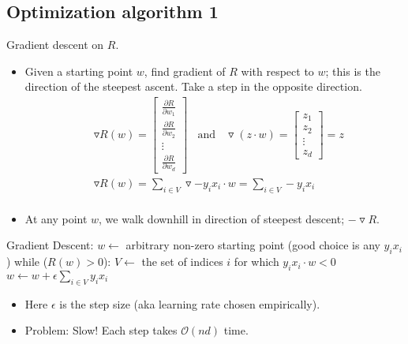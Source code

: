 \documentclass[10pt]{article}
\begin{document}
	\subsection*{Optimization algorithm 1} Gradient descent on $R$.
		\begin{itemize}
			\item Given a starting point $w$, find gradient of $R$ with respect to $w$; this is the direction of the steepest ascent. Take a step in the opposite direction.
				\begin{align*}
					& \triangledown R(w) =
						\begin{bmatrix}
 							\frac{\partial R}{\partial w_{1}}\\
 							\frac{\partial R}{\partial w_{2}} \\
 							\vdots \\
 							\frac{\partial R}{\partial w_{d}}
 						\end{bmatrix}
 					\ \ \ \ \text{and} \ \ \ \
 					\triangledown(z \cdot w) =
						\begin{bmatrix}
 							z_{1} \\
 							z_{2} \\
 							\vdots \\
 							z_{d}
 						\end{bmatrix} = z\\
 					& \triangledown R(w) = \sum_{i \in V} \triangledown -y_{i}x_{i} \cdot w = \sum_{i \in V} -y_{i}x_{i}\\
				\end{align*}
			\item At any point $w$, we walk downhill in direction of steepest descent; $- \triangledown R$.
			\end{itemize}
\begin{codeblock}
	Gradient Descent:
	    $w \leftarrow$ arbitrary non-zero starting point (good choice is any $y_{i}x_{i}$)
	    while ($R(w) > 0$):
	        $V \leftarrow$ the set of indices $i$ for which $y_{i}x_{i} \cdot w < 0$
	        $w \leftarrow w + \epsilon \sum_{i \in V} y_{i}x_{i}$
\end{codeblock}
			\begin{itemize}
			\item Here $\epsilon$ is the step size (aka learning rate chosen empirically).
			
			\item Problem: Slow! Each step takes $\mathcal{O}(nd)$ time.
		\end{itemize}
	
\end{document}
